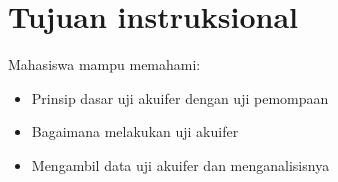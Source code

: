 \section{Tujuan instruksional} 

Mahasiswa mampu memahami:
\begin{itemize}
\item Prinsip dasar uji akuifer dengan uji pemompaan
\item Bagaimana melakukan uji akuifer
\item Mengambil data uji akuifer dan menganalisisnya
\end{itemize}


